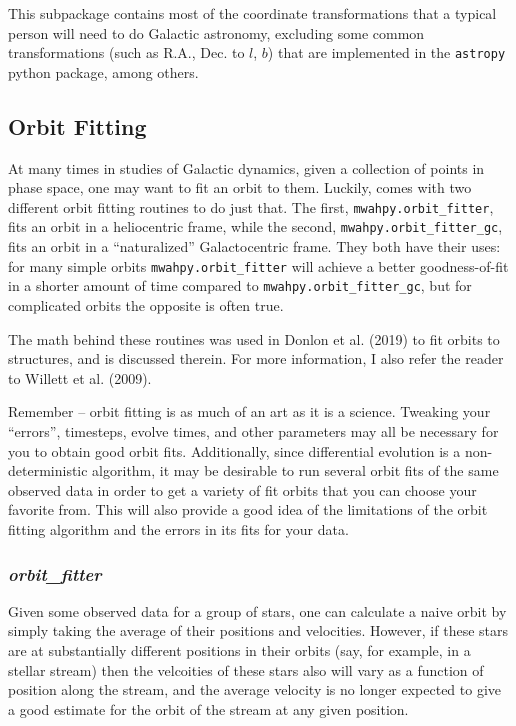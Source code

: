 \documentclass{article}
\begin{document}
This subpackage contains most of the coordinate transformations that a typical person will need to do Galactic astronomy, excluding some common transformations (such as R.A., Dec. to $l$, $b$) that are implemented in the \verb!astropy! python package, among others. 

\subsection{Orbit Fitting}

At many times in studies of Galactic dynamics, given a collection of points in phase space, one may want to fit an orbit to them. Luckily, \mwahpy comes with two different orbit fitting routines to do just that. The first, \verb!mwahpy.orbit_fitter!, fits an orbit in a heliocentric frame, while the second, \verb!mwahpy.orbit_fitter_gc!, fits an orbit in a ``naturalized'' Galactocentric frame. They both have their uses: for many simple orbits \verb!mwahpy.orbit_fitter! will achieve a better goodness-of-fit in a shorter amount of time compared to \verb!mwahpy.orbit_fitter_gc!, but for complicated orbits the opposite is often true. 

The math behind these routines was used in Donlon et al. (2019) to fit orbits to structures, and is discussed therein. For more information, I also refer the reader to Willett et al. (2009). 

Remember -- orbit fitting is as much of an art as it is a science. Tweaking your ``errors'', timesteps, evolve times, and other parameters may all be necessary for you to obtain good orbit fits. Additionally, since differential evolution is a non-deterministic algorithm, it may be desirable to run several orbit fits of the same observed data in order to get a variety of fit orbits that you can choose your favorite from. This will also provide a good idea of the limitations of the orbit fitting algorithm and the errors in its fits for your data.

\subsubsection{\textit{orbit\_fitter}}

Given some observed data for a group of stars, one can calculate a naive orbit by simply taking the average of their positions and velocities. However, if these stars are at substantially different positions in their orbits (say, for example, in a stellar stream) then the velcoities of these stars also will vary as a function of position along the stream, and the average velocity is no longer expected to give a good estimate for the orbit of the stream at any given position. 
\end{document}
